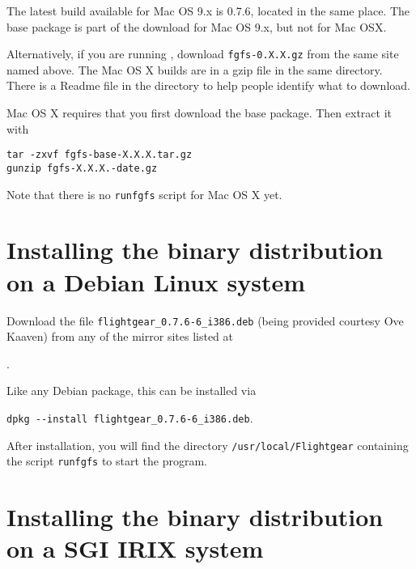 The latest build available for Mac OS 9.x is 0.7.6, located in the same place. The base package is part of the download for Mac OS 9.x, but not for Mac OSX.

Alternatively, if you are running , download \texttt{fgfs-0.X.X.gz} from
the same site named above. The Mac OS X  builds are in a gzip file in the same directory. There is a Readme file in the directory to help people identify what to download. 

Mac OS X requires that you first download the base package. Then extract it with

\noindent
\texttt{tar -zxvf fgfs-base-X.X.X.tar.gz}\\
\texttt{gunzip fgfs-X.X.X.-date.gz}

\noindent
Note that there is no \texttt{runfgfs} script for Mac OS X yet.

\section{Installing the binary distribution on a Debian Linux system}

Download the file \verb/flightgear_0.7.6-6_i386.deb/ (being provided courtesy Ove
Kaaven) from any of the  mirror sites listed at
 \medskip

.
 \medskip

 \noindent
 Like any Debian package, this can be installed via
 \medskip

  \verb/dpkg --install flightgear_0.7.6-6_i386.deb/.
\medskip

 \noindent
 After installation, you will find the directory \texttt{/usr/local/Flightgear}
containing the script \texttt{runfgfs} to start the program.


\section{Installing the binary distribution on a SGI IRIX system}

